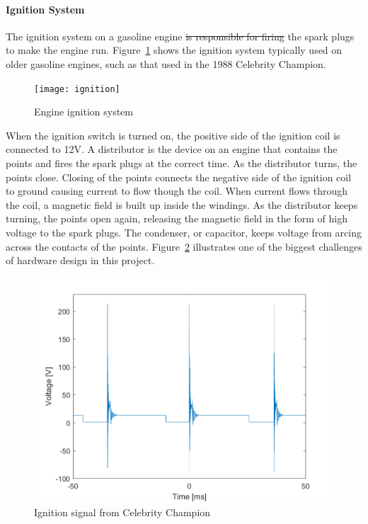 \documentclass[11pt]{article}
\providecommand{\DIFaddtex}[1]{{\protect\color{blue}\uwave{#1}}} %
\providecommand{\DIFdeltex}[1]{{\protect\color{red}\sout{#1}}}                      %
\providecommand{\DIFaddbegin}{} %
\providecommand{\DIFaddend}{} %
\providecommand{\DIFdelbegin}{} %
\providecommand{\DIFdelend}{} %
\providecommand{\DIFaddbeginFL}{} %
\providecommand{\DIFaddendFL}{} %
\providecommand{\DIFdelbeginFL}{} %
\providecommand{\DIFdelendFL}{} %
\providecommand{\DIFadd}[1]{\texorpdfstring{\DIFaddtex{#1}}{#1}} %
\providecommand{\DIFdel}[1]{\texorpdfstring{\DIFdeltex{#1}}{}} %
\newcommand{\DIFscaledelfig}{0.5}
\newlength{\DIFdelgraphicswidth} %
\newlength{\DIFdelgraphicsheight} %
\newcommand{\DIFaddincludegraphics}[2][]{{\color{blue}\fbox{\DIFOincludegraphics[#1]{#2}}}} %
\newcommand{\DIFdelincludegraphics}[2][]{%
\sbox{\DIFdelgraphicsbox}{\DIFOincludegraphics[#1]{#2}}%
\settoboxwidth{\DIFdelgraphicswidth}{\DIFdelgraphicsbox} %
\settoboxtotalheight{\DIFdelgraphicsheight}{\DIFdelgraphicsbox} %
\scalebox{\DIFscaledelfig}{%
\parbox[b]{\DIFdelgraphicswidth}{\usebox{\DIFdelgraphicsbox}\\[-\baselineskip] \rule{\DIFdelgraphicswidth}{0em}}\llap{\resizebox{\DIFdelgraphicswidth}{\DIFdelgraphicsheight}{%
\setlength{\unitlength}{\DIFdelgraphicswidth}%
\begin{picture}(1,1)%
\thicklines\linethickness{2pt} %
{\color[rgb]{1,0,0}\put(0,0){\framebox(1,1){}}}%
{\color[rgb]{1,0,0}\put(0,0){\line( 1,1){1}}}%
{\color[rgb]{1,0,0}\put(0,1){\line(1,-1){1}}}%
\end{picture}%
}\hspace*{3pt}}} %
} %
\DeclareRobustCommand{\DIFaddbegin}{\DIFOaddbegin \let\includegraphics\DIFaddincludegraphics} %
\DeclareRobustCommand{\DIFaddend}{\DIFOaddend \let\includegraphics\DIFOincludegraphics} %
\DeclareRobustCommand{\DIFdelbegin}{\DIFOdelbegin \let\includegraphics\DIFdelincludegraphics} %
\DeclareRobustCommand{\DIFdelend}{\DIFOaddend \let\includegraphics\DIFOincludegraphics} %
\DeclareRobustCommand{\DIFaddbeginFL}{\DIFOaddbeginFL \let\includegraphics\DIFaddincludegraphics} %
\DeclareRobustCommand{\DIFaddendFL}{\DIFOaddendFL \let\includegraphics\DIFOincludegraphics} %
\DeclareRobustCommand{\DIFdelbeginFL}{\DIFOdelbeginFL \let\includegraphics\DIFdelincludegraphics} %
\DeclareRobustCommand{\DIFdelendFL}{\DIFOaddendFL \let\includegraphics\DIFOincludegraphics} %
\begin{document}
\paragraph{Ignition System} %
\label{par:ignition}

The ignition system on a gasoline engine \DIFdelbegin \DIFdel{is responsible for firing }\DIFdelend \DIFaddbegin \DIFadd{fires }\DIFaddend the spark plugs to make the engine run. Figure~\ref{fig:ignition} shows the ignition system typically used on older gasoline engines, such as that used in the 1988 Celebrity Champion.



\begin{figure}[H]
    \centering
    \DIFdelbeginFL %
\DIFdelendFL \DIFaddbeginFL \texttt{[image: ignition]}
    \DIFaddendFL \caption{Engine ignition system}
    \label{fig:ignition}
\end{figure}

When the ignition switch is turned on, the positive side of the ignition coil is connected to 12V. A distributor is the device on an engine that contains the points and fires the spark plugs at the correct time. As the distributor turns, the points close. Closing of the points connects the negative side of the ignition coil to ground causing current to flow though the coil. When current flows through the coil, a magnetic field is built up inside the windings. As the distributor keeps turning, the points open again, releasing the magnetic field in the form of high voltage to the spark plugs. The condenser, or capacitor, keeps voltage from arcing across the contacts of the points. Figure~\ref{fig:boat_noise} illustrates one of the biggest challenges of hardware design in this project\DIFaddbegin \DIFadd{: voltage spikes}\DIFaddend .

\begin{figure}[H]
    \centering
    \DIFdelbeginFL %
\DIFdelendFL \DIFaddbeginFL \includegraphics[width=.8\textwidth]{boat_raw}
    \DIFaddendFL \caption{Ignition signal from Celebrity Champion}
    \label{fig:boat_noise}
\end{figure}
\end{document}

